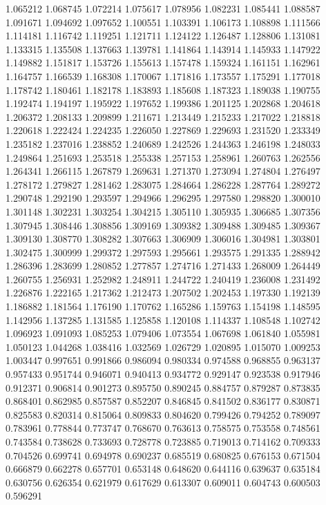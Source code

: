 1.065212
1.068745
1.072214
1.075617
1.078956
1.082231
1.085441
1.088587
1.091671
1.094692
1.097652
1.100551
1.103391
1.106173
1.108898
1.111566
1.114181
1.116742
1.119251
1.121711
1.124122
1.126487
1.128806
1.131081
1.133315
1.135508
1.137663
1.139781
1.141864
1.143914
1.145933
1.147922
1.149882
1.151817
1.153726
1.155613
1.157478
1.159324
1.161151
1.162961
1.164757
1.166539
1.168308
1.170067
1.171816
1.173557
1.175291
1.177018
1.178742
1.180461
1.182178
1.183893
1.185608
1.187323
1.189038
1.190755
1.192474
1.194197
1.195922
1.197652
1.199386
1.201125
1.202868
1.204618
1.206372
1.208133
1.209899
1.211671
1.213449
1.215233
1.217022
1.218818
1.220618
1.222424
1.224235
1.226050
1.227869
1.229693
1.231520
1.233349
1.235182
1.237016
1.238852
1.240689
1.242526
1.244363
1.246198
1.248033
1.249864
1.251693
1.253518
1.255338
1.257153
1.258961
1.260763
1.262556
1.264341
1.266115
1.267879
1.269631
1.271370
1.273094
1.274804
1.276497
1.278172
1.279827
1.281462
1.283075
1.284664
1.286228
1.287764
1.289272
1.290748
1.292190
1.293597
1.294966
1.296295
1.297580
1.298820
1.300010
1.301148
1.302231
1.303254
1.304215
1.305110
1.305935
1.306685
1.307356
1.307945
1.308446
1.308856
1.309169
1.309382
1.309488
1.309485
1.309367
1.309130
1.308770
1.308282
1.307663
1.306909
1.306016
1.304981
1.303801
1.302475
1.300999
1.299372
1.297593
1.295661
1.293575
1.291335
1.288942
1.286396
1.283699
1.280852
1.277857
1.274716
1.271433
1.268009
1.264449
1.260755
1.256931
1.252982
1.248911
1.244722
1.240419
1.236008
1.231492
1.226876
1.222165
1.217362
1.212473
1.207502
1.202453
1.197330
1.192139
1.186882
1.181564
1.176190
1.170762
1.165286
1.159763
1.154198
1.148595
1.142956
1.137285
1.131585
1.125858
1.120108
1.114337
1.108548
1.102742
1.096923
1.091093
1.085253
1.079406
1.073554
1.067698
1.061840
1.055981
1.050123
1.044268
1.038416
1.032569
1.026729
1.020895
1.015070
1.009253
1.003447
0.997651
0.991866
0.986094
0.980334
0.974588
0.968855
0.963137
0.957433
0.951744
0.946071
0.940413
0.934772
0.929147
0.923538
0.917946
0.912371
0.906814
0.901273
0.895750
0.890245
0.884757
0.879287
0.873835
0.868401
0.862985
0.857587
0.852207
0.846845
0.841502
0.836177
0.830871
0.825583
0.820314
0.815064
0.809833
0.804620
0.799426
0.794252
0.789097
0.783961
0.778844
0.773747
0.768670
0.763613
0.758575
0.753558
0.748561
0.743584
0.738628
0.733693
0.728778
0.723885
0.719013
0.714162
0.709333
0.704526
0.699741
0.694978
0.690237
0.685519
0.680825
0.676153
0.671504
0.666879
0.662278
0.657701
0.653148
0.648620
0.644116
0.639637
0.635184
0.630756
0.626354
0.621979
0.617629
0.613307
0.609011
0.604743
0.600503
0.596291
